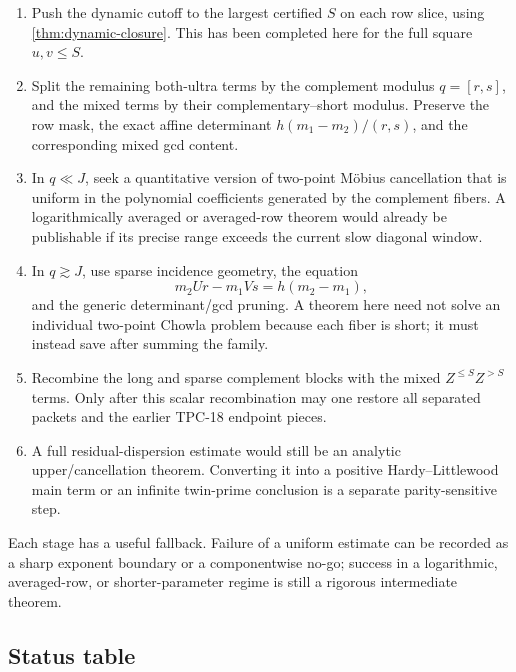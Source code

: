 \begin{enumerate}[label=\textup{Stage \arabic*:},leftmargin=6.2em]
 \item Push the dynamic cutoff to the largest certified \(S\) on each
 row slice, using \cref{thm:dynamic-closure}.  This has been completed
 here for the full square \(u,v\le S\).

 \item Split the remaining both-ultra terms by the complement modulus
 \(q=[r,s]\), and the mixed terms by their complementary--short
 modulus.  Preserve the row mask, the exact affine determinant
 \(h(m_1-m_2)/(r,s)\), and the corresponding mixed gcd content.

 \item In \(q\ll J\), seek a quantitative version of two-point
 M\"obius cancellation that is uniform in the polynomial coefficients
 generated by the complement fibers.  A logarithmically averaged or
 averaged-row theorem would already be publishable if its precise
 range exceeds the current slow diagonal window.

 \item In \(q\gtrsim J\), use sparse incidence geometry, the equation
\begin{equation}
 m_2U r-m_1V s=h(m_2-m_1),
 \label{eq:sparse-incidence-equation}
\end{equation}
 and the generic determinant/gcd pruning.  A theorem here need not
 solve an individual two-point Chowla problem because each fiber is
 short; it must instead save after summing the family.

 \item Recombine the long and sparse complement blocks with the mixed
 \(Z^{\le S}Z^{>S}\) terms.  Only after this scalar recombination may
 one restore all separated packets and the earlier TPC-18 endpoint
 pieces.

 \item A full residual-dispersion estimate would still be an analytic
 upper/cancellation theorem.  Converting it into a positive
 Hardy--Littlewood main term or an infinite twin-prime conclusion is a
 separate parity-sensitive step.
\end{enumerate}

Each stage has a useful fallback.  Failure of a uniform estimate can
be recorded as a sharp exponent boundary or a componentwise no-go;
success in a logarithmic, averaged-row, or shorter-parameter regime is
still a rigorous intermediate theorem.

\subsection{Status table}


